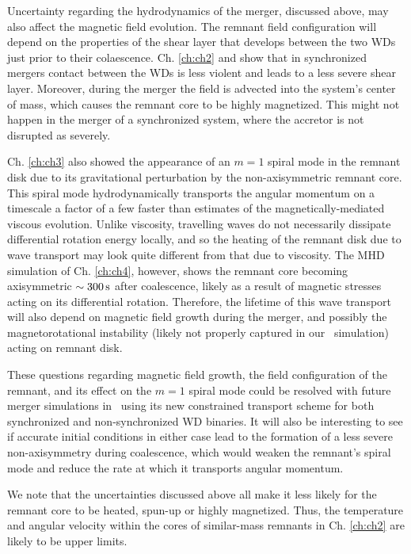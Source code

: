Uncertainty regarding the hydrodynamics of the merger, discussed above, may also affect the magnetic field evolution.  The remnant field configuration will depend on the properties of the shear layer that develops between the two WDs just prior to their colaescence.  Ch. \ref{ch:ch2} and \citep{dan+14} show that in synchronized mergers contact between the WDs is less violent and leads to a less severe shear layer.  Moreover, during the merger the field is advected into the system's center of mass, which causes the remnant core to be highly magnetized.  This might not happen in the merger of a synchronized system, where the accretor is not disrupted as severely.

Ch. \ref{ch:ch3} also showed the appearance of an $m = 1$ spiral mode in the remnant disk due to its gravitational perturbation by the non-axisymmetric remnant core.  This spiral mode hydrodynamically transports the angular momentum on a timescale a factor of a few faster than estimates of the magnetically-mediated viscous evolution.  Unlike viscosity, travelling waves do not necessarily dissipate differential rotation energy locally, and so the heating of the remnant disk due to wave transport may look quite different from that due to viscosity.  The MHD simulation of Ch. \ref{ch:ch4}, however, shows the remnant core becoming axisymmetric $\sim300\,\mathrm{s}$ after coalescence, likely as a result of magnetic stresses acting on its differential rotation.  Therefore, the lifetime of this wave transport will also depend on magnetic field growth during the merger, and possibly the magnetorotational instability (likely not properly captured in our \arepo\ simulation) acting on remnant disk.

These questions regarding magnetic field growth, the field configuration of the remnant, and its effect on the $m = 1$ spiral mode could be resolved with future merger simulations in \arepo\ using its new constrained transport scheme for both synchronized and non-synchronized WD binaries.  It will also be interesting to see if accurate initial conditions in either case lead to the formation of a less severe non-axisymmetry during coalescence, which would weaken the remnant's spiral mode and reduce the rate at which it transports angular momentum.  

We note that the uncertainties discussed above all make it less likely for the remnant core to be heated, spun-up or highly magnetized.  Thus, the temperature and angular velocity within the cores of similar-mass remnants in Ch. \ref{ch:ch2} are likely to be upper limits.

